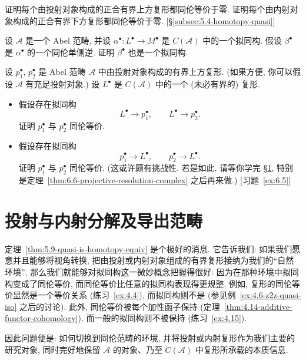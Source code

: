 \begin{prob}\label{ex:5.12}
证明每个由投射对象构成的正合有界上方复形都同伦等价于零. 证明每个由内射对象构成的正合有界下方复形都同伦等价于零. [\S\ref{subsec:5.4-homotopy-quasi}]
\end{prob}

\begin{prob}\label{ex:5.13}
设 $\mathcal{A}$ 是一个 Abel 范畴, 并设 $\alpha^\bullet:L^\bullet\to M^\bullet$ 是 $C(\mathcal{A})$ 中的一个拟同构. 假设 $\beta^\bullet$ 是 $\alpha^\bullet$ 的一个同伦单侧逆. 证明 $\beta^\bullet$ 也是一个拟同构.
\end{prob}

\begin{prob}\label{ex:5.14}
设 $p_1^\bullet$, $p_2^\bullet$ 是 Abel 范畴 $\mathcal{A}$ 中由投射对象构成的有界上方复形. (如果方便, 你可以假设 $\mathcal{A}$ 有充足投射对象.) 设 $L^\bullet$ 是 $C(\mathcal{A})$ 中的一个 (未必有界的) 复形.
\begin{itemize}
\item 假设存在拟同构
\[
L^\bullet\longrightarrow p_1^\bullet,\qquad L^\bullet\longrightarrow p_2^\bullet.
\]
证明 $p_1^\bullet$ 与 $p_2^\bullet$ 同伦等价.
\item 假设存在拟同构
\[
p_1^\bullet\longrightarrow L^\bullet,\qquad p_2^\bullet\longrightarrow L^\bullet.
\]
证明 $p_1^\bullet$ 与 $p_2^\bullet$ 同伦等价. (这或许颇有挑战性. 若是如此, 请等你学完 \S\ref{sec:9.6-resolutions}, 特别是定理~\ref{thm:6.6-projective-resolution-complex} 之后再来做.) [习题~\ref{ex:6.5}]
\end{itemize}
\end{prob}

\section{投射与内射分解及导出范畴}
\label{sec:9.6-resolutions}

定理~\ref{thm:5.9-quasi-is-homotopy-equiv} 是个极好的消息. 它告诉我们: 如果我们愿意并且能够将视角转换, 把由投射或内射对象组成的有界复形接纳为我们的``自然环境'', 那么我们就能够对拟同构这一微妙概念把握得很好: 因为在那种环境中拟同构变成了同伦等价, 而同伦等价比任意的拟同构表现得更规整. 例如, 复形的同伦等价显然是一个等价关系 (练习~\ref{ex:4.4}), 而拟同构则不是 (参见例~\ref{ex:4.6-z2z-quasi-iso} 之后的讨论). 此外, 同伦等价被每个加性函子保持 (定理~\ref{thm:4.14-additive-functor-cohomology}), 而一般的拟同构则不被保持 (练习~\ref{ex:4.15}).

因此问题便是: 如何切换到同伦范畴的环境, 并将投射或内射复形作为我们主要的研究对象, 同时完好地保留 $\mathcal{A}$ 的对象、乃至 $C(\mathcal{A})$ 中复形所承载的本质信息.

